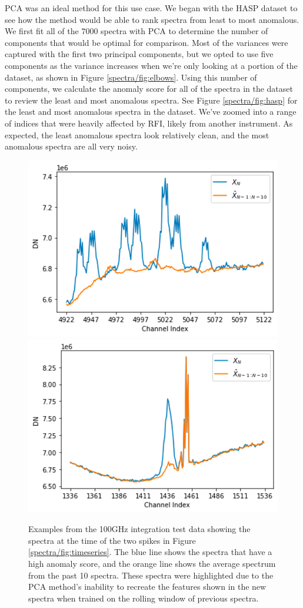 PCA was an ideal method for this use case. 
We began with the HASP dataset to see how the method would be able to rank spectra from least to most anomalous.
We first fit all of the $7000$ spectra with PCA to determine the number of components that would be optimal for comparison.
Most of the variances were captured with the first two principal components, but we opted to use five components as the variance increases when we're only looking at a portion of the dataset, as shown in Figure \ref{spectra/fig:elbows}.
Using this number of components, we calculate the anomaly score for all of the spectra in the dataset to review the least and most anomalous spectra. 
See Figure \ref{spectra/fig:hasp} for the least and most anomalous spectra in the dataset. 
We've zoomed into a range of indices that were heavily affected by RFI, likely from another instrument. 
As expected, the least anomalous spectra look relatively clean, and the most anomalous spectra are all very noisy. 

\begin{figure}[t]
    \centering
    \includegraphics[width=0.49\linewidth]{figs/spectra/pca1.png}
    \includegraphics[width=0.49\linewidth]{figs/spectra/pca2.png}
    \caption[Novel Examples from the 100GHz Integration Test]{Examples from the 100GHz integration test data showing the spectra at the time of the two spikes in Figure \ref{spectra/fig:timeseries}. The blue line shows the spectra that have a high anomaly score, and the orange line shows the average spectrum from the past 10 spectra. These spectra were highlighted due to the PCA method's inability to recreate the features shown in the new spectra when trained on the rolling window of previous spectra.}
    \label{spectra/fig:100ghz}
\end{figure}

